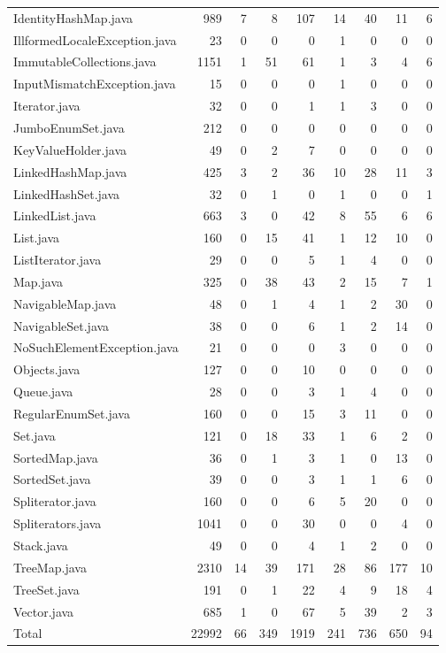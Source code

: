 \begin{table}[h]
\begin{tabular}{lrrrrrrrr}
IdentityHashMap.java & 989 & 7 & 8 & 107 & 14 & 40 & 11 & 6 \\
IllformedLocaleException.java & 23 & 0 & 0 & 0 & 1 & 0 & 0 & 0 \\
ImmutableCollections.java & 1151 & 1 & 51 & 61 & 1 & 3 & 4 & 6 \\
InputMismatchException.java & 15 & 0 & 0 & 0 & 1 & 0 & 0 & 0 \\
Iterator.java & 32 & 0 & 0 & 1 & 1 & 3 & 0 & 0 \\
JumboEnumSet.java & 212 & 0 & 0 & 0 & 0 & 0 & 0 & 0 \\
KeyValueHolder.java & 49 & 0 & 2 & 7 & 0 & 0 & 0 & 0 \\
LinkedHashMap.java & 425 & 3 & 2 & 36 & 10 & 28 & 11 & 3 \\
LinkedHashSet.java & 32 & 0 & 1 & 0 & 1 & 0 & 0 & 1 \\
LinkedList.java & 663 & 3 & 0 & 42 & 8 & 55 & 6 & 6 \\
List.java & 160 & 0 & 15 & 41 & 1 & 12 & 10 & 0 \\
ListIterator.java & 29 & 0 & 0 & 5 & 1 & 4 & 0 & 0 \\
Map.java & 325 & 0 & 38 & 43 & 2 & 15 & 7 & 1 \\
NavigableMap.java & 48 & 0 & 1 & 4 & 1 & 2 & 30 & 0 \\
NavigableSet.java & 38 & 0 & 0 & 6 & 1 & 2 & 14 & 0 \\
NoSuchElementException.java & 21 & 0 & 0 & 0 & 3 & 0 & 0 & 0 \\
Objects.java & 127 & 0 & 0 & 10 & 0 & 0 & 0 & 0 \\
Queue.java & 28 & 0 & 0 & 3 & 1 & 4 & 0 & 0 \\
RegularEnumSet.java & 160 & 0 & 0 & 15 & 3 & 11 & 0 & 0 \\
Set.java & 121 & 0 & 18 & 33 & 1 & 6 & 2 & 0 \\
SortedMap.java & 36 & 0 & 1 & 3 & 1 & 0 & 13 & 0 \\
SortedSet.java & 39 & 0 & 0 & 3 & 1 & 1 & 6 & 0 \\
Spliterator.java & 160 & 0 & 0 & 6 & 5 & 20 & 0 & 0 \\
Spliterators.java & 1041 & 0 & 0 & 30 & 0 & 0 & 4 & 0 \\
Stack.java & 49 & 0 & 0 & 4 & 1 & 2 & 0 & 0 \\
TreeMap.java & 2310 & 14 & 39 & 171 & 28 & 86 & 177 & 10 \\
TreeSet.java & 191 & 0 & 1 & 22 & 4 & 9 & 18 & 4 \\
Vector.java & 685 & 1 & 0 & 67 & 5 & 39 & 2 & 3 \\
\hline
Total & 22992 & 66 & 349 & 1919 & 241 & 736 & 650 & 94 \\
\hline
\end{tabular}
\end{table}

